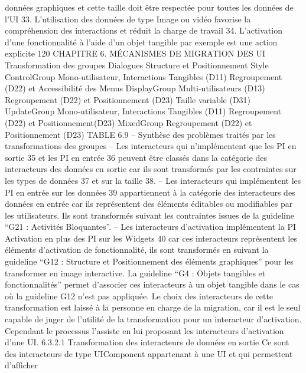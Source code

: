 \documentclass{article}
\begin{document}
donn\'{e}es graphiques et cette taille doit \^{e}tre respect\'{e}e pour toutes les donn\'{e}es de l’UI
33. L’utilisation des donn\'{e}es de type Image ou vid\'{e}o favorise la compr\'{e}hension des interactions et r\'{e}duit la charge de
travail
34. L’activation d’une fonctionnalit\'{e} \`{a} l’aide d’un objet tangible par exemple est une action explicite
120
CHAPITRE 6. MÉCANISMES DE MIGRATION DES UI
Transformation des
groupes
Dialogues
Structure et
Positionnement
Style
ControlGroup
Mono-utilisateur,
Interactions Tangibles
(D11)
Regroupement (D22)
et Accessibilit\'{e} des
Menus
DisplayGroup
Multi-utilisateurs
(D13)
Regroupement (D22)
et Positionnement
(D23)
Taille variable (D31)
UpdateGroup
Mono-utilisateur,
Interactions Tangibles
(D11)
Regroupement (D22)
et
Positionnement(D23)
MixedGroup
Regroupement (D22)
et Positionnement
(D23)
TABLE 6.9 – Synth\`{e}se des probl\`{e}mes trait\'{e}s par les transformations des groupes
– Les interacteurs qui n’impl\'{e}mentent que les PI en sortie 35 et les PI en entr\'{e}e 36 peuvent \^{e}tre
class\'{e}s dans la cat\'{e}gorie des interacteurs des donn\'{e}es en sortie car ils sont transform\'{e}s par
les contraintes sur les types de donn\'{e}es 37 et sur la taille 38.
– Les interacteurs qui impl\'{e}mentent les PI en entr\'{e}e sur les donn\'{e}es 39 appartiennent \`{a} la cat\'{e}gorie des interacteurs des donn\'{e}es en entr\'{e}e car ils repr\'{e}sentent des \'{e}l\'{e}ments \'{e}ditables ou
modiﬁables par les utilisateurs. Ils sont transform\'{e}s suivant les contraintes issues de la guideline
“G21 : Activit\'{e}s Bloquantes”.
– Les interacteurs d’activation impl\'{e}mentent la PI Activation en plus des PI sur les Widgets 40
car ces interacteurs repr\'{e}sentent les \'{e}l\'{e}ments d’activation de fonctionnalit\'{e}, ils sont transform\'{e}s
en suivant la guideline “G12 : Structure et Positionnement des \'{e}l\'{e}ments graphiques” pour
les transformer en image interactive. La guideline “G4 : Objets tangibles et fonctionnalit\'{e}s”
permet d’associer ces interacteurs \`{a} un objet tangible dans le cas o\`{u} la guideline G12 n’est
pas appliqu\'{e}e. Le choix des interacteurs de cette transformation est laiss\'{e} \`{a} la personne en
charge de la migration, car il est le seul capable de juger de l’utilit\'{e} de la transformation pour
un interacteur d’activation. Cependant le processus l’assiste en lui proposant les interacteurs
d’activation d’une UI.
6.3.2.1
Transformation des interacteurs de donn\'{e}es en sortie
Ce sont des interacteurs de type UIComponent appartenant \`{a} une UI et qui permettent d’afﬁcher
\end{document}
